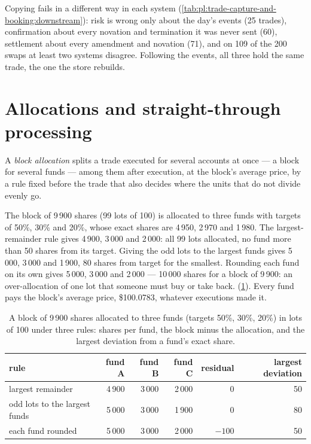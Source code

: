 Copying fails in a different way in each system (\cref{tab:pl:trade-capture-and-booking:downstream}): risk is wrong only about the day's events
(25 trades), confirmation about every novation and termination it was never sent (60), settlement about every amendment and novation (71), and
on 109 of the 200 swaps at least two systems disagree. Following the events, all three hold the same trade, the one the store rebuilds.

\section{Allocations and straight-through processing}

\begin{definition}\label{def:pl:trade-capture-and-booking:allocation}
A \emph{block allocation} splits a trade executed for several accounts at once --- a block for several funds --- among
them after execution, at the block's average price, by a rule fixed before the trade that also decides where the units that do not divide
evenly go.
\end{definition}

\label{lst:pl:trade-capture-and-booking:allocate}

The block of 9\,900 shares (99 lots of 100) is allocated to three funds with targets of 50\%, 30\% and 20\%, whose exact shares are 4\,950, 2\,970
and 1\,980. The largest-remainder rule gives 4\,900, 3\,000 and 2\,000: all 99 lots allocated, no fund more than 50 shares from its target. Giving
the odd lots to the largest funds gives 5\,000, 3\,000 and 1\,900, 80 shares from target for the smallest. Rounding each fund on its own gives
5\,000, 3\,000 and 2\,000 --- 10\,000 shares for a block of 9\,900: an over-allocation of one lot that someone must buy or take back.
(\cref{tab:pl:trade-capture-and-booking:allocation}). Every fund pays the block's average price, \$100.0783, whatever executions made it.

\begin{table}[ht]
\centering\small
\begin{tabular}{lrrrrr}
\toprule
rule & fund A & fund B & fund C & residual & largest deviation \\
\midrule
largest remainder & 4\,900 & 3\,000 & 2\,000 & 0 & 50 \\
odd lots to the largest funds & 5\,000 & 3\,000 & 1\,900 & 0 & 80 \\
each fund rounded & 5\,000 & 3\,000 & 2\,000 & $-100$ & 50 \\
\bottomrule
\end{tabular}
\caption{A block of 9\,900 shares allocated to three funds (targets 50\%, 30\%, 20\%) in lots of 100 under three rules: shares per fund, the
block minus the allocation, and the largest deviation from a fund's exact share.}\label{tab:pl:trade-capture-and-booking:allocation}
\end{table}

